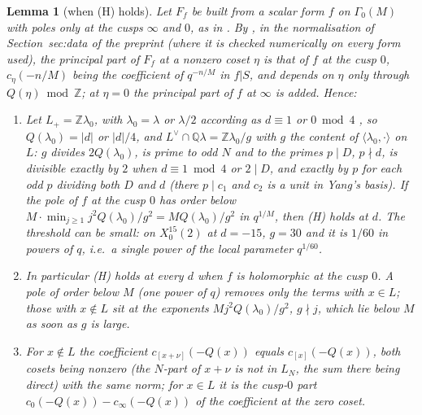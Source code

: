 \documentclass[11pt,reqno]{amsart}
\theoremstyle{plain}
\newtheorem{lemma}[theorem]{Lemma}
\theoremstyle{definition}
\newcommand{\Q}{\mathbb{Q}}
\newcommand{\Z}{\mathbb{Z}}
\newcommand{\Ldual}{L^{\vee}}
\newcommand{\Lp}{L_{+}}
\begin{document}
\begin{lemma}[when (H) holds]\label{lem:H}
Let $F_f$ be built from a scalar form $f$ on $\Gamma_0(M)$ with poles only at the cusps $\infty$
and $0$, as in \cite[(6)]{GY}. By \cite[Lemma~24]{GY}, in the normalisation of \textup{Section~sec:data of the preprint}
(where it is checked numerically on every form used), the principal part of $F_f$ at a nonzero
coset $\eta$ is that of $f$ at the cusp $0$, $c_\eta(-n/M)$ being the coefficient of $q^{-n/M}$ in
$f|S$, and depends on $\eta$ only through $Q(\eta)\bmod\Z$; at $\eta=0$ the principal part of $f$
at $\infty$ is added. Hence:
\begin{enumerate}
\item Let $\Lp=\Z\lambda_0$, with $\lambda_0=\lambda$ or $\lambda/2$ according as $d\equiv1$ or
      $0\bmod4$ \cite[proof of Lemma~18]{Yang}, so $Q(\lambda_0)=\lvert d\rvert$ or
      $\lvert d\rvert/4$, and $\Ldual\cap\Q\lambda=\Z\lambda_0/g$ with $g$ the content of
      $\langle\lambda_0,\cdot\rangle$ on $L$: $g$ divides $2Q(\lambda_0)$, is prime to odd $N$ and
      to the primes $p\mid D$, $p\nmid d$, is divisible exactly by $2$ when $d\equiv1\bmod4$ or
      $2\mid D$, and exactly by $p$ for each odd $p$ dividing both $D$ and $d$ (there $p\mid c_1$
      and $c_2$ is a unit in Yang's basis). If the pole of $f$ at the cusp $0$ has order below
      $M\cdot\min_{j\ge1}j^2Q(\lambda_0)/g^2=MQ(\lambda_0)/g^2$ in $q^{1/M}$, then (H) holds at
      $d$. The threshold can be small: on $X_0^{15}(2)$ at $d=-15$, $g=30$ and it is $1/60$ in
      powers of $q$, i.e.\ a single power of the local parameter $q^{1/60}$.
\item In particular (H) holds at every $d$ when $f$ is holomorphic at the cusp $0$. A pole of
      order below $M$ (one power of $q$) removes only the terms with $x\in L$; those with
      $x\notin L$ sit at the exponents $Mj^2Q(\lambda_0)/g^2$, $g\nmid j$, which lie below $M$ as
      soon as $g$ is large.
\item For $x\notin L$ the coefficient $c_{[x+\nu]}(-Q(x))$ equals $c_{[x]}(-Q(x))$, both cosets
      being nonzero (the $N$-part of $x+\nu$ is not in $L_N$, the sum there being direct) with
      the same norm; for $x\in L$ it is the cusp-$0$ part $c_0(-Q(x))-c_\infty(-Q(x))$ of the
      coefficient at the zero coset.
\end{enumerate}
\end{lemma}
\end{document}
